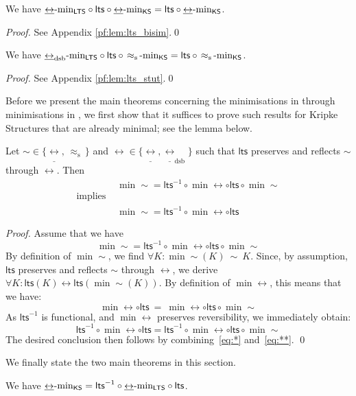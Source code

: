 \documentclass{llncs}
\newcommand{\bisim}{\mbox{$\underline{\leftrightarrow}$}}
\newcommand{\dsbbisim}{\mbox{$\underline{\leftrightarrow}_{\mathrm{dsb}}$}}
\newcommand{\stuttering}{\,\approx_{\mathrm{s}}\,}
\newcommand{\lts}{\mathsf{lts}}
\newcommand{\ltsrev}{\lts^{-1}}
\begin{document}
\begin{lemma}
\label{lem:lts_bisim} We have $\minLTS{\bisim} \circ \lts \circ \minKS{\bisim}
= \lts \circ \minKS{\bisim}$.

\end{lemma}


\begin{proof}
See Appendix \ref{pf:lem:lts_bisim}.\qed
\end{proof}


\begin{lemma}
\label{lem:lts_stut}
We have $\minLTS{\dsbbisim} \circ \lts \circ \minKS{\stuttering} =
\lts \circ \minKS{\stuttering}$.
\end{lemma}

\begin{proof}
See Appendix \ref{pf:lem:lts_stut}.\qed
\end{proof}
Before we present the main theorems concerning the minimisations in \KS
through minimisations in \LTS, we first show that it suffices to prove
such results for Kripke Structures that are already minimal; see the
lemma below.
\begin{lemma}
\label{lem:minimal}
Let $\sim {} \in \{\bisim,\stuttering\}$ and
$\leftrightarrow {} \in \{\bisim,\dsbbisim \}$ such that $\lts$ preserves and reflects $\sim$ through
$\leftrightarrow$.  Then
$$
\begin{array}{ll}
& \min{\sim} = \ltsrev \circ \min{\leftrightarrow} \circ \lts \circ
\min{\sim} \\
\text{implies } & \\
& \min{\sim} = \ltsrev \circ \min{\leftrightarrow} \circ \lts
\end{array}
$$
\end{lemma}

\begin{proof}
Assume that we have
\begin{equation}
\tag{*}
\label{eq:*}
\min{\sim} = \ltsrev \circ \min{\leftrightarrow} \circ \lts \circ
\min{\sim}
\end{equation}
By definition of $\min{\sim}$, we find
$ \forall K: \min{\sim}(K)\ \sim\ K$.
Since, by assumption, $\lts$ preserves and reflects $\sim$ through
$\leftrightarrow$, we derive
$
\forall K: \lts(K) \leftrightarrow \lts(\min{\sim}(K))
$.
By definition of $\min{\leftrightarrow}$, this means that we have:
$$
\min{\leftrightarrow} \circ \lts\ = \
           \min{\leftrightarrow} \circ \lts \circ \min{\sim}
$$
As $\ltsrev$ is functional, and $\min{\leftrightarrow}$ preserves
reversibility, we immediately obtain:
\begin{equation}
\tag{**}
\label{eq:**}
\ltsrev \circ \min{\leftrightarrow} \circ \lts =
\ltsrev \circ \min{\leftrightarrow} \circ \lts \circ \min{\sim}
\end{equation}
The desired conclusion then follows by combining~\ref{eq:*} and~\ref{eq:**}.
\qed
\end{proof}
We finally state the two main theorems in this section.
\begin{theorem}
\label{th:ks2lts_bisim_minimal}
We have $\minKS{\bisim} = \ltsrev \circ \minLTS{\bisim} \circ \lts$.
\end{theorem}
\end{document}
